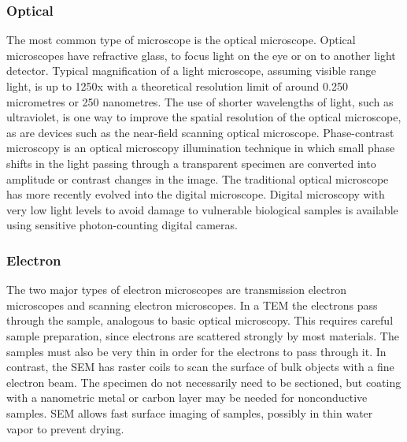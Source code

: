\documentclass[12pt]{article}
\begin{document}
\subsubsection{Optical}
The most common type of microscope is the optical microscope.
Optical microscopes have refractive glass, to focus light on the eye or on to another light detector.
Typical magnification of a light microscope, assuming visible range light, is up to 1250x with a theoretical resolution limit of around 0.250 micrometres or 250 nanometres.
The use of shorter wavelengths of light, such as ultraviolet, is one way to improve the spatial resolution of the optical microscope, as are devices such as the near-field scanning optical microscope.
Phase-contrast microscopy is an optical microscopy illumination technique in which small phase shifts in the light passing through a transparent specimen are converted into amplitude or contrast changes in the image.
The traditional optical microscope has more recently evolved into the digital microscope.
Digital microscopy with very low light levels to avoid damage to vulnerable biological samples is available using sensitive photon-counting digital cameras.

\subsubsection{Electron}
The two major types of electron microscopes are transmission electron microscopes and scanning electron microscopes.
In a TEM the electrons pass through the sample, analogous to basic optical microscopy.
This requires careful sample preparation, since electrons are scattered strongly by most materials.
The samples must also be very thin in order for the electrons to pass through it.
In contrast, the SEM has raster coils to scan the surface of bulk objects with a fine electron beam.
The specimen do not necessarily need to be sectioned, but coating with a nanometric metal or carbon layer may be needed for nonconductive samples.
SEM allows fast surface imaging of samples, possibly in thin water vapor to prevent drying.
\end{document}
